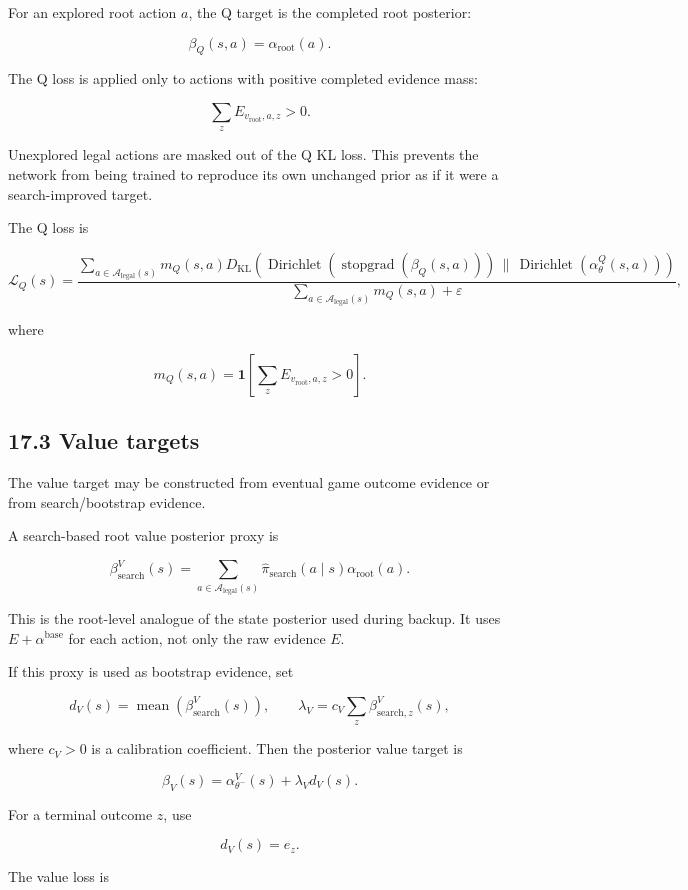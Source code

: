 \documentclass[11pt]{article}
\newcommand{\one}{\mathbf{1}}
\newcommand{\Dir}{\operatorname{Dirichlet}}
\newcommand{\mean}{\operatorname{mean}}
\newcommand{\stopgrad}{\operatorname{stopgrad}}
\newcommand{\Legal}{\mathcal{A}_{\mathrm{legal}}}
\begin{document}
For an explored root action \(a\), the Q target is the completed root posterior:

\[
\beta_Q(s,a)
=
\alpha_{\mathrm{root}}(a).
\]

The Q loss is applied only to actions with positive completed evidence mass:

\[
\sum_z E_{v_{\mathrm{root}},a,z} > 0.
\]

Unexplored legal actions are masked out of the Q KL loss. This prevents the
network from being trained to reproduce its own unchanged prior as if it were a
search-improved target.

The Q loss is

\[
\mathcal{L}_Q(s)
=
\frac{
\sum_{a\in\Legal(s)}
m_Q(s,a)
D_{\mathrm{KL}}
\left(
\Dir
\left(
\stopgrad(\beta_Q(s,a))
\right)
\,\|\,
\Dir
\left(
\alpha_\theta^Q(s,a)
\right)
\right)
}{
\sum_{a\in\Legal(s)} m_Q(s,a)
+
\varepsilon
},
\]

where

\[
m_Q(s,a)
=
\one
\left[
\sum_z E_{v_{\mathrm{root}},a,z} > 0
\right].
\]

\subsection*{17.3 Value targets}

The value target may be constructed from eventual game outcome evidence or from
search/bootstrap evidence.

A search-based root value posterior proxy is

\[
\beta_{\mathrm{search}}^V(s)
=
\sum_{a\in\Legal(s)}
\hat\pi_{\mathrm{search}}(a\mid s)
\alpha_{\mathrm{root}}(a).
\]

This is the root-level analogue of the state posterior used during backup. It
uses \(E+\alpha^{\mathrm{base}}\) for each action, not only the raw evidence
\(E\).

If this proxy is used as bootstrap evidence, set

\[
d_V(s)
=
\mean
\left(
\beta_{\mathrm{search}}^V(s)
\right),
\qquad
\lambda_V
=
 c_V
\sum_z \beta_{\mathrm{search},z}^V(s),
\]

where \(c_V>0\) is a calibration coefficient. Then the posterior value target is

\[
\beta_V(s)
=
\alpha_{\theta^-}^V(s)
+
\lambda_V d_V(s).
\]

For a terminal outcome \(z\), use

\[
d_V(s)=e_z.
\]

The value loss is
\end{document}
